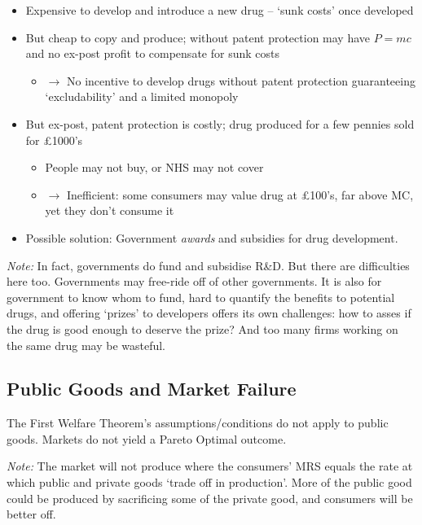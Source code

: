 \documentclass[]{article}
\providecommand{\tightlist}{%
  \setlength{\itemsep}{0pt}\setlength{\parskip}{0pt}}
\begin{document}
\begin{itemize}
\tightlist
\item
  Expensive to develop and introduce a new drug -- `sunk costs' once
  developed
\item
  But cheap to copy and produce; without patent protection may have
  \(P=mc\) and no ex-post profit to compensate for sunk costs

  \begin{itemize}
  \tightlist
  \item
    \(\rightarrow\) No incentive to develop drugs without patent
    protection guaranteeing `excludability' and a limited monopoly
  \end{itemize}
\item
  But ex-post, patent protection is costly; drug produced for a few
  pennies sold for £1000's

  \begin{itemize}
  \tightlist
  \item
    People may not buy, or NHS may not cover
  \item
    \(\rightarrow\) Inefficient: some consumers may value drug at
    £100's, far above MC, yet they don't consume it
  \end{itemize}
\item
  Possible solution: Government \emph{awards} and subsidies for drug
  development.
\end{itemize}

\emph{Note:} In fact, governments do fund and subsidise R\&D. But there
are difficulties here too. Governments may free-ride off of other
governments. It is also for government to know whom to fund, hard to
quantify the benefits to potential drugs, and offering `prizes' to
developers offers its own challenges: how to asses if the drug is good
enough to deserve the prize? And too many firms working on the same drug
may be wasteful.

\medskip

\hypertarget{public-goods-and-market-failure}{%
\subsection{Public Goods and Market
Failure}\label{public-goods-and-market-failure}}

The First Welfare Theorem's assumptions/conditions do not apply to
public goods. Markets do not yield a Pareto Optimal outcome.

\emph{Note:} The market will not produce where the consumers' MRS equals
the rate at which public and private goods `trade off in production'.
More of the public good could be produced by sacrificing some of the
private good, and consumers will be better off.\\
\end{document}
